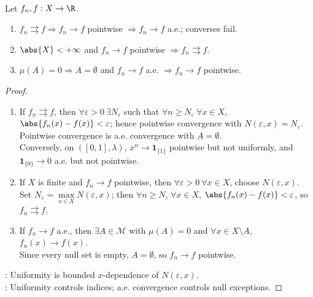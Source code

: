 \begin{proposition} \label{prop:basic-mode-implications} \\
Let $f_n,f:X\to\R$.
\begin{enumerate}[label=(\roman*)]
\setlength{\itemsep}{0pt}
\item $f_n\rightrightarrows f\Rightarrow f_n\to f$ pointwise $\Rightarrow f_n\to f$ a.e.; converses fail.
\item $\abs{X}<+\infty$ and $f_n\to f$ pointwise $\Rightarrow f_n\rightrightarrows f$.
\item $\mu(A)=0\Rightarrow A=\emptyset$ and $f_n\to f$ a.e. $\Rightarrow f_n\to f$ pointwise.
\end{enumerate}
\begin{proof}
\begin{enumerate}[label=(\roman*)]
\setlength{\itemsep}{0pt}
\item If $f_n\rightrightarrows f$, then $\forall\varepsilon>0\ \exists N_\varepsilon$ such that $\forall n\geq N_\varepsilon\ \forall x\in X$, $\abs{f_n(x)-f(x)}<\varepsilon$; hence pointwise convergence with $N(\varepsilon,x)=N_\varepsilon$. Pointwise convergence is a.e. convergence with $A=\emptyset$.\\
Conversely, on $([0,1],\lambda)$, $x^n\to\mathbf{1}_{\{1\}}$ pointwise but not uniformly, and $\mathbf{1}_{\{0\}}\to0$ a.e. but not pointwise.
\item If $X$ is finite and $f_n\to f$ pointwise, then $\forall\varepsilon>0\ \forall x\in X$, choose $N(\varepsilon,x)$.\\
Set $N_\varepsilon=\max\limits_{x\in X}N(\varepsilon,x)$; then $\forall n\geq N_\varepsilon\ \forall x\in X$, $\abs{f_n(x)-f(x)}<\varepsilon$, so $f_n\rightrightarrows f$.
\item If $f_n\to f$ a.e., then $\exists A\in\mathcal{M}$ with $\mu(A)=0$ and $\forall x\in X\setminus A$, $f_n(x)\to f(x)$.\\
Since every null set is empty, $A=\emptyset$, so $f_n\to f$ pointwise.
\end{enumerate}
: Uniformity is bounded $x$-dependence of $N(\varepsilon,x)$.\\
: Uniformity controls indices; a.e. convergence controls null exceptions.
\end{proof}
\end{proposition}

